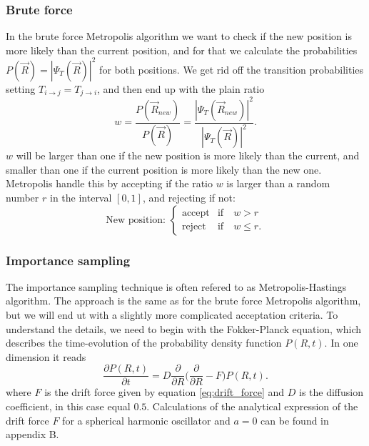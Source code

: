 \documentclass[norsk,a4paper,12pt]{article}
\begin{document}
\subsubsection{Brute force}
In the brute force Metropolis algorithm we want to check if the new position is more likely than the current position, and for that we calculate the probabilities $P(\vec{R})=|\Psi_T(\vec{R})|^2$ for both positions. We get rid off the transition probabilities setting $T_{i\rightarrow j}=T_{j\rightarrow i}$, and then end up with the plain ratio
\begin{equation}
w=\frac{P(\vec{R}_{new})}{P(\vec{R})}=\frac{|\Psi_T(\vec{R}_{new})|^2}{|\Psi_T(\vec{R})|^2}.
\end{equation}
$w$ will be larger than one if the new position is more likely than the current, and smaller than one if the current position is more likely than the new one. Metropolis handle this by accepting if the ratio $w$ is larger than a random number $r$ in the interval $[0,1]$, and rejecting if not:
\begin{equation}
\text{New position: }
\begin{cases} 
   \text{accept} & \text{if}\quad w > r \\
   \text{reject} & \text{if}\quad w \leq r.
\end{cases}
\end{equation}

\subsubsection{Importance sampling} \label{Importance_sampling}
The importance sampling technique is often refered to as Metropolis-Hastings algorithm. The approach is the same as for the brute force Metropolis algorithm, but we will end ut with a slightly more complicated acceptation criteria. To understand the details, we need to begin with the Fokker-Planck equation, which describes the time-evolution of the probability density function $P(R,t)$. In one dimension it reads
\begin{equation}
\frac{\partial P(R,t)}{\partial t} = D\frac{\partial}{\partial R}\bigg(\frac{\partial}{\partial R} - F\bigg)P(R,t).
\end{equation}
where $F$ is the drift force given by equation \ref{eq:drift_force} and $D$ is the diffusion coefficient, in this case equal $0.5$. Calculations of the analytical expression of the drift force $F$ for a spherical harmonic oscillator and $a=0$ can be found in appendix B.
\end{document}
